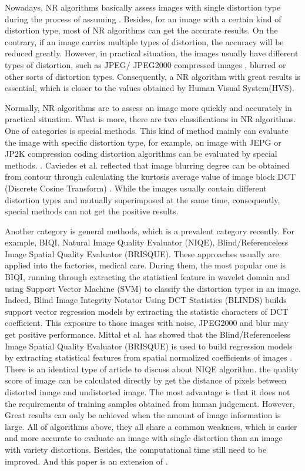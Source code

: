 Nowadays, NR algorithms basically assess images with single distortion type during the process of assuming \cite{b7}. Besides, for an image with a certain kind of distortion type, most of NR algorithms can get the accurate results. On the contrary, if an image carries multiple types of distortion, the accuracy will be reduced greatly. However, in practical situation, the images usually have different types of distortion, such as JPEG/ JPEG2000 compressed images \cite{b8,b9}, blurred or other sorts of distortion types. Consequently, a NR algorithm with great results is essential, which is closer to the values obtained by Human Visual System(HVS).

Normally, NR algorithms are to assess an image more quickly and accurately in practical situation. What is more, there are two classifications in NR algorithms. One of categories is special methods. This kind of method mainly can evaluate the image with specific distortion type, for example, an image with JEPG or JP2K compression coding distortion algorithms can be evaluated by special methods. \cite{b10,b11,b12}. Caviedes et al. reflected that image blurring degree can be obtained from contour through calculating the kurtosis average value of image block DCT (Discrete Cosine Transform) \cite{b13,b14,b15}. While the images usually contain different distortion types and mutually superimposed at the same time, consequently, special methods can not get the positive results.

Another category is general methods, which is a prevalent category recently. For example, BIQI, Natural Image Quality Evaluator (NIQE), Blind/Referenceless Image Spatial Quality Evaluator (BRISQUE). These approaches usually are applied into the factories, medical care. During them, the most popular one is BIQI, running through extracting the statistical feature in wavelet domain and using Support Vector Machine (SVM) to classify the distortion types in an image. Indeed, Blind Image Integrity Notator Using DCT Statistics (BLINDS) \cite{b16,b17} builds support vector regression models by extracting the statistic characters of DCT coefficient. This exposure to those images with noise, JPEG2000 and blur may get positive performance. Mittal et al. has showed that the Blind/Referenceless Image Spatial Quality Evaluator (BRISQUE) is used to build regression models by extracting statistical features from spatial normalized coefficients of images \cite{b18,b19}. There is an identical type of article to discuss about NIQE algorithm. the quality score of image can be calculated directly by get the distance of pixels between distorted image and undistorted image. The most advantage is that it does not the requirements of training samples obtained from human judgement. However, Great results can only be achieved when the amount of image information is large. All of algorithms above, they all share a common weakness, which is easier and more accurate to evaluate an image with single distortion than an image with variety distortions. Besides, the computational time still need to be improved. And this paper is an extension of \cite{b33}.

